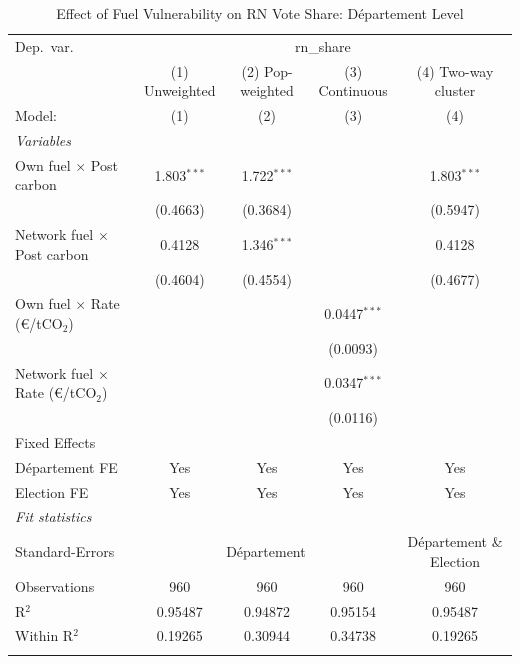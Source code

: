 \begin{table}[htbp]
   \caption{Effect of Fuel Vulnerability on RN Vote Share: D\'{e}partement Level}
   \centering
   \begin{tabular}{lcccc}
      \tabularnewline \midrule \midrule
      Dep.\ var. & \multicolumn{4}{c}{rn\_share}\\
                                                   & (1) Unweighted & (2) Pop-weighted & (3) Continuous & (4) Two-way cluster \\   
      Model:                                       & (1)            & (2)              & (3)            & (4)\\  
      \midrule
      \emph{Variables}\\
      Own fuel $\times$ Post carbon                & 1.803$^{***}$  & 1.722$^{***}$    &                & 1.803$^{***}$\\   
                                                   & (0.4663)       & (0.3684)         &                & (0.5947)\\   
      Network fuel $\times$ Post carbon            & 0.4128         & 1.346$^{***}$    &                & 0.4128\\   
                                                   & (0.4604)       & (0.4554)         &                & (0.4677)\\   
      Own fuel $\times$ Rate (\euro/tCO$_2$)       &                &                  & 0.0447$^{***}$ &   \\   
                                                   &                &                  & (0.0093)       &   \\   
      Network fuel $\times$ Rate (\euro/tCO$_2$)   &                &                  & 0.0347$^{***}$ &   \\   
                                                   &                &                  & (0.0116)       &   \\   
      \midrule Fixed Effects\\
      D\'{e}partement FE                           & Yes            & Yes              & Yes            & Yes\\  
      Election FE                                  & Yes            & Yes              & Yes            & Yes\\  
      \midrule
      \emph{Fit statistics}\\
      Standard-Errors & \multicolumn{3}{c}{D\'{e}partement} & D\'{e}partement \& Election \\ 
      Observations                                 & 960            & 960              & 960            & 960\\  
      R$^2$                                        & 0.95487        & 0.94872          & 0.95154        & 0.95487\\  
      Within R$^2$                                 & 0.19265        & 0.30944          & 0.34738        & 0.19265\\  
      \midrule \midrule & \tabularnewline
   \end{tabular}
\end{table}
